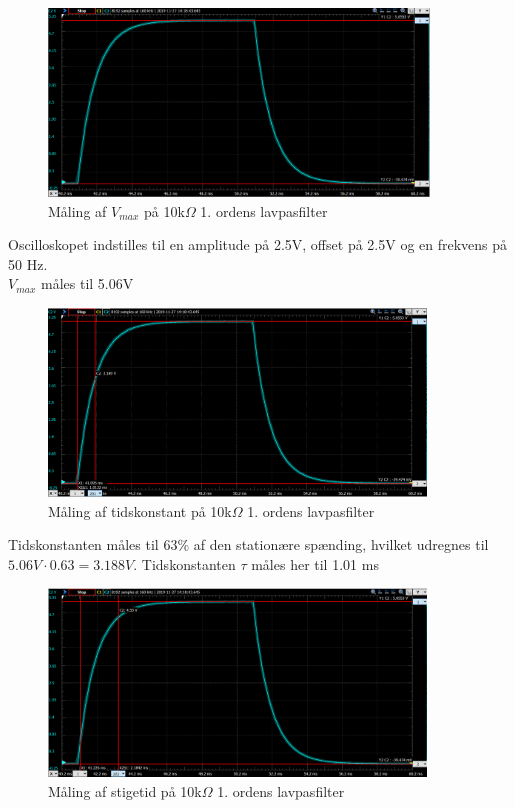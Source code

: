 \begin{figure}[h!]
\begin{center}
\includegraphics[height=5cm]{E_Fig/Rea_1_10_max}
\caption{Måling af $V_{max}$ på 10k$\Omega$ 1. ordens lavpasfilter}
\label{Rea_1_10_max}
\end{center}
\end{figure}

Oscilloskopet indstilles til en amplitude på 2.5V, offset på 2.5V og en frekvens på 50 Hz.\\
$V_{max}$ måles til 5.06V

\begin{figure}[h!]
\begin{center}
\includegraphics[height=5cm]{E_Fig/Rea_1_10_tidskonstant}
\caption{Måling af tidskonstant på 10k$\Omega$ 1. ordens lavpasfilter}
\label{Rea_1_10_tidskonstant}
\end{center}
\end{figure}

Tidskonstanten måles til 63$\%$ af den stationære spænding, hvilket udregnes til $5.06V \cdot 0.63=3.188V$. Tidskonstanten $\tau$ måles her til 1.01 ms



\begin{figure}[h!]
\begin{center}
\includegraphics[height=5cm]{E_Fig/Rea_1_10_stigetid}
\caption{Måling af stigetid på 10k$\Omega$ 1. ordens lavpasfilter}
\label{Rea_1_10_stigetid}
\end{center}
\end{figure}


